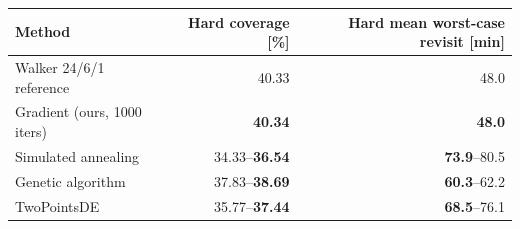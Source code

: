 \begin{tabular}{lrr}
\toprule
\textbf{Method} & \textbf{Hard coverage [\%]} & \textbf{Hard mean worst-case revisit [min]} \\
\midrule
Walker 24/6/1 reference & 40.33 & 48.0 \\
Gradient (ours, 1000 iters) & \textbf{40.34} & \textbf{48.0} \\
\midrule
Simulated annealing       & 34.33--\textbf{36.54} & \textbf{73.9}--80.5 \\
Genetic algorithm          & 37.83--\textbf{38.69} & \textbf{60.3}--62.2 \\
TwoPointsDE~\citep{rapin_nevergrad_2019} & 35.77--\textbf{37.44} & \textbf{68.5}--76.1 \\
\bottomrule
\end{tabular}
